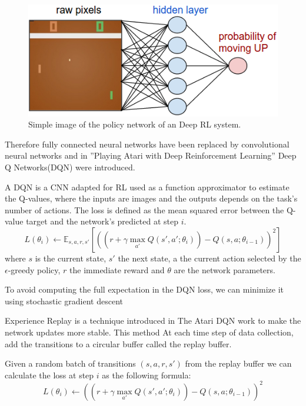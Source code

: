 \begin{figure}[ht]
    \centering
    \includegraphics[scale=0.4]{images/DRL_network.png}
    \caption{Simple image of the policy network of an Deep RL system.}
    \label{fig:DRL_network}
\end{figure}

Therefore fully connected neural networks have been replaced by convolutional neural networks and in ”Playing Atari
with Deep Reinforcement Learning” \cite{mnih2013playing} Deep Q Networks(DQN) were introduced.

A DQN is a CNN adapted for RL used as a function approximator to estimate the Q-values, where the inputs are images and the outputs depends on the task's number of actions.
The loss is defined as the mean squared error between the Q-value target and the network's predicted at step $i$.
\begin{equation*}
    L(\theta_i) \leftarrow \mathbb{E}_{s, a, r, s'} [((r + \gamma \max_{a'} Q(s', a'; \theta_i)) - Q(s, a; \theta_{i-1}))^2]
\end{equation*}
where $s$ is the current state, $s'$ the next state, a the current action selected by the $\epsilon$-greedy policy, $r$ the immediate reward and $\theta$ are the network parameters.

To avoid computing the full expectation in the DQN loss, we can minimize it using stochastic gradient descent

Experience Replay is a technique introduced in The Atari DQN work to make the network updates more stable.
This method At each time step of data collection, add the transitions to a circular buffer called the replay buffer.

Given a random batch of transitions $(s, a, r, s')$ from the replay buffer we can calculate the loss at step $i$ as the following formula:
\begin{equation*}
    L(\theta_i) \leftarrow ((r + \gamma \max_{a'} Q(s', a'; \theta_i)) - Q(s, a; \theta_{i-1}))^2
\end{equation*}

